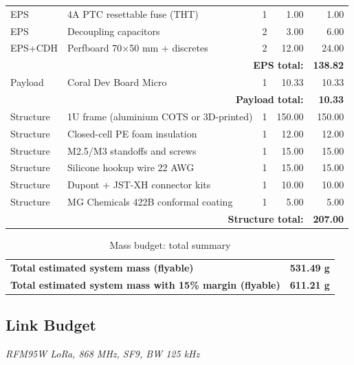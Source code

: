 \begin{longtable}{p{1.6cm}p{6cm}rrr}
EPS & 4A PTC resettable fuse (THT) & 1 & 1.00 & 1.00 \\
EPS & Decoupling capacitors & 2 & 3.00 & 6.00 \\
EPS+CDH & Perfboard 70$\times$50 mm + discretes & 2 & 12.00 & 24.00 \\
\midrule
\multicolumn{4}{r}{\textbf{EPS total:}} & \textbf{138.82} \\
Payload & Coral Dev Board Micro & 1 & 10.33 & 10.33 \\
\midrule
\multicolumn{4}{r}{\textbf{Payload total:}} & \textbf{10.33} \\
Structure & 1U frame (aluminium COTS or 3D-printed) & 1 & 150.00 & 150.00 \\
Structure & Closed-cell PE foam insulation & 1 & 12.00 & 12.00 \\
Structure & M2.5/M3 standoffs and screws & 1 & 15.00 & 15.00 \\
Structure & Silicone hookup wire 22 AWG & 1 & 15.00 & 15.00 \\
Structure & Dupont + JST-XH connector kits & 1 & 10.00 & 10.00 \\
Structure & MG Chemicals 422B conformal coating & 1 & 5.00 & 5.00 \\
\midrule
\multicolumn{4}{r}{\textbf{Structure total:}} & \textbf{207.00} \\
\end{longtable}
\normalsize

\begin{table}[H]
\centering
\begin{tabular}{lr}
\toprule
\textbf{Total estimated system mass (flyable)} & \textbf{531.49 g} \\
\textbf{Total estimated system mass with 15\% margin (flyable)} & \textbf{611.21 g} \\
\bottomrule
\end{tabular}
\caption{Mass budget: total summary}
\end{table}

\subsection{Link Budget}

\textit{RFM95W LoRa, 868 MHz, SF9, BW 125 kHz}

